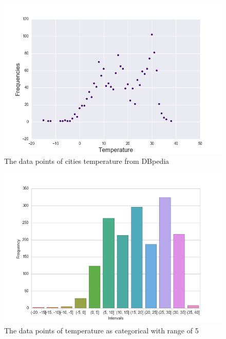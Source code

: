 \documentclass{article}
\begin{document}
\begin{figure}[!ht]
  \caption{The data points of cities temperature from DBpedia}
  \centering
    \includegraphics[width=1.0\textwidth]{tempscatt}
\end{figure}


\begin{figure}[!ht]
  \caption{The data points of temperature as categorical with range of 5}
  \centering
    \includegraphics[width=1.0\textwidth]{range5}
\end{figure}
\end{document}
